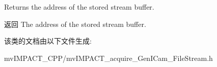Returns the address of the stored stream buffer. 

\begin{DoxyReturn}{返回}
The address of the stored stream buffer. 
\end{DoxyReturn}


该类的文档由以下文件生成\+:\begin{DoxyCompactItemize}
\item 
mv\+I\+M\+P\+A\+C\+T\+\_\+\+C\+P\+P/mv\+I\+M\+P\+A\+C\+T\+\_\+acquire\+\_\+\+Gen\+I\+Cam\+\_\+\+File\+Stream.\+h\end{DoxyCompactItemize}
